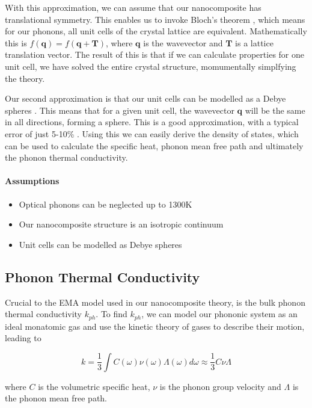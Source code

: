 \documentclass[12pt]{article}
\renewcommand{\vec}[1]{\mathbf{#1}}
\begin{document}
With this approximation, we can assume that our nanocomposite has translational symmetry. This enables us to invoke Bloch's theorem \cite{kittel}, which means for our phonons, all unit cells of the crystal lattice are equivalent. Mathematically this is $f(\vec{q}) = f(\vec{q} + \vec{T})$, where $\vec{q}$ is the wavevector and $\vec{T}$ is a lattice translation vector. The result of this is that if we can calculate properties for one unit cell, we have solved the entire crystal structure, momumentally simplfying the theory.

Our second approximation is that our unit cells can be modelled as a Debye spheres \cite{kittel}. This means that for a given unit cell, the wavevector $\vec{q}$ will be the same in all directions, forming a sphere. This is a good approximation, with a typical error of just 5-10\% \cite{gp}. Using this we can easily derive the density of states, which can be used to calculate the specific heat, phonon mean free path and ultimately the phonon thermal conductivity.

\paragraph{Assumptions}
\begin{itemize}
  \item Optical phonons can be neglected up to 1300K
  \item Our nanocomposite structure is an isotropic continuum
  \item Unit cells can be modelled as Debye spheres
\end{itemize}

\subsection{Phonon Thermal Conductivity}
\label{sec:phonon-thermal}
Crucial to the EMA model \cite{ema} used in our nanocomposite theory, is the bulk phonon thermal conductivity $k_{ph}$. To find $k_{ph}$, we can model our phononic system as an ideal monatomic gas and use the kinetic theory of gases to describe their motion, leading to \cite{kittel}

\begin{equation}
\label{eq:phonon-thermal}
	k = \frac{1}{3} \int C(\omega) \nu(\omega) \Lambda (\omega) d\omega \approx \frac{1}{3}C\nu\Lambda
\end{equation}

where $C$ is the volumetric specific heat, $\nu$ is the phonon group velocity and $\Lambda$ is the phonon mean free path.
\end{document}
